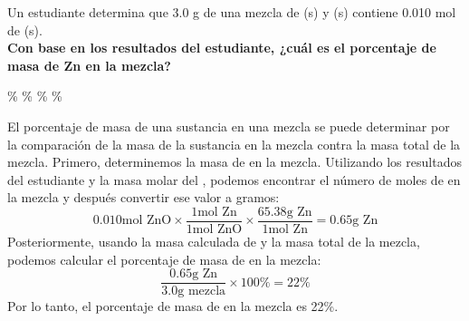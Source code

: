 Un estudiante determina que 3.0 g de una mezcla de (s) y (s) contiene 0.010 mol de (s).\\
\textbf{Con base en los resultados del estudiante, ¿cuál es el porcentaje de masa de Zn en la mezcla?}\\

\begin{oneparchoices}
    \%
    \%
    \%
    \%
\end{oneparchoices}

\begin{solutionbox}{6cm}
    El porcentaje de masa de una sustancia en una mezcla se puede determinar por la comparación de la masa de la sustancia en la mezcla contra la masa total de la mezcla.
    Primero, determinemos la masa de   en la mezcla. Utilizando los resultados del estudiante y la masa molar del , podemos encontrar el número de moles de  en la mezcla y después convertir ese valor a gramos:
    \[0.010 \text{mol ZnO}\times\frac{1 \text{mol Zn}}{1 \text{mol ZnO}}\times\frac{65.38 \text{g Zn}}{1 \text{mol Zn}}=0.65 \text{g Zn} \]
    Posteriormente, usando la masa calculada de  y la masa total de la mezcla, podemos calcular el porcentaje de masa de  en la mezcla:
    \[\frac{0.65 \text{g Zn}}{3.0 \text{g mezcla}}\times 100\%=22\% \]
    Por lo tanto, el porcentaje de masa de  en la mezcla es 22\%.
    \end{solutionbox}